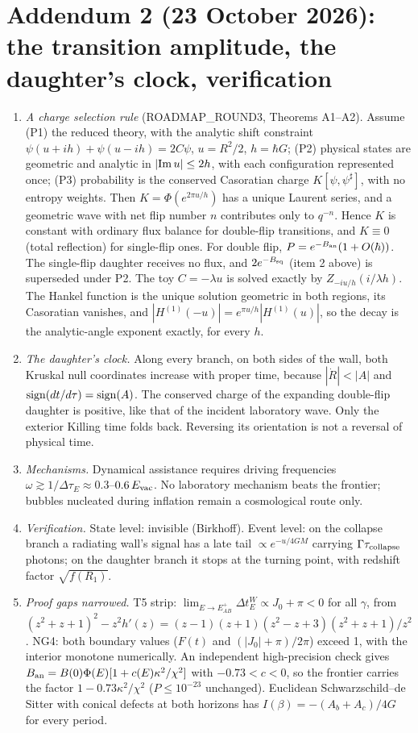\documentclass[11pt,a4paper]{article}
\theoremstyle{remark}\newtheorem{remark}[theorem]{Remark}
\begin{document}
\section*{Addendum 2 (23 October 2026): the transition amplitude, the daughter's clock, verification}
\begin{enumerate}
\item \emph{A charge selection rule} (ROADMAP\_ROUND3, Theorems A1--A2). Assume (P1) the reduced theory, with the analytic shift constraint
$\psi(u+ih)+\psi(u-ih)=2C\psi$, $u=R^2/2$, $h=\hbar G$; (P2) physical states are geometric and analytic in $|{\rm Im}\,u|\le2h$, with each configuration
represented once; (P3) probability is the conserved Casoratian charge $K[\psi,\psi^\sharp]$, with no entropy weights. Then $K=\Phi(e^{2\pi u/h})$ has a
unique Laurent series, and a geometric wave with net flip number $n$ contributes only to $q^{-n}$. Hence $K$ is constant with ordinary flux balance for
double-flip transitions, and $K\equiv0$ (total reflection) for single-flip ones. For double flip, $P=e^{-B_{\rm an}}(1+O(\hbar))$. The single-flip daughter
receives no flux, and $2e^{-B_{\rm sq}}$ (item 2 above) is superseded under P2. The toy $C=-\lambda u$ is solved exactly by $Z_{-iu/h}(i/\lambda h)$. The
Hankel function is the unique solution geometric in both regions, its Casoratian vanishes, and $|H^{(1)}(-u)|=e^{\pi u/h}|H^{(1)}(u)|$, so the decay is the
analytic-angle exponent exactly, for every $h$.
\item \emph{The daughter's clock.} Along every branch, on both sides of the wall, both Kruskal null coordinates increase with proper time, because
$|\dot R|<|A|$ and ${\rm sign}(dt/d\tau)={\rm sign}(A)$. The conserved charge of the expanding double-flip daughter is positive, like that of the incident
laboratory wave. Only the exterior Killing time folds back. Reversing its orientation is not a reversal of physical time.
\item \emph{Mechanisms.} Dynamical assistance requires driving frequencies $\omega\gtrsim1/\Delta\tau_E\approx0.3$--$0.6\,E_{\rm vac}$. No laboratory mechanism
beats the frontier; bubbles nucleated during inflation remain a cosmological route only.
\item \emph{Verification.} State level: invisible (Birkhoff). Event level: on the collapse branch a radiating wall's signal has a late tail
$\propto e^{-u/4GM}$ carrying $\Gamma\tau_{\rm collapse}$ photons; on the daughter branch it stops at the turning point, with redshift factor $\sqrt{f(R_1)}$.
\item \emph{Proof gaps narrowed.} T5 strip: $\lim_{E\to E_{AB}^+}\Delta t^W_E\propto J_0+\pi<0$ for all $\gamma$, from
$(z^2+z+1)^2-z^2h'(z)=(z-1)(z+1)(z^2-z+3)(z^2+z+1)/z^2$. NG4: both boundary values ($F(t)$ and $(|J_0|+\pi)/2\pi$) exceed 1, with the interior monotone
numerically. An independent high-precision check gives $B_{\rm an}=B(0)\Phi(E)[1+c(E)\kappa^2/\chi^2]$ with $-0.73<c<0$, so the frontier carries the factor
$1-0.73\kappa^2/\chi^2$ ($P\le10^{-23}$ unchanged). Euclidean Schwarzschild--de Sitter with conical defects at both horizons has
$I(\beta)=-(A_b+A_c)/4G$ for every period.
\end{enumerate}
\end{document}
